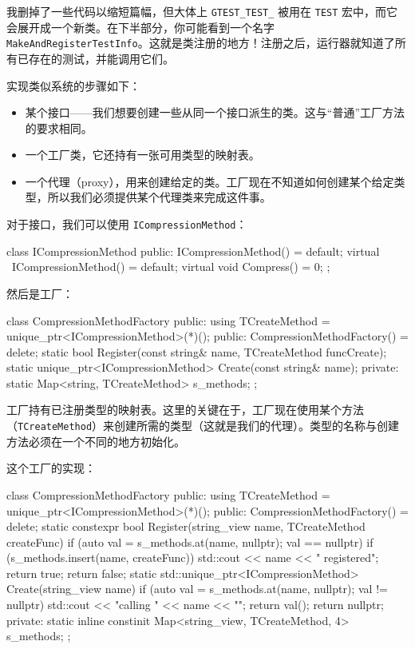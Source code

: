 我删掉了一些代码以缩短篇幅，但大体上 \texttt{GTEST\_TEST\_} 被用在 \texttt{TEST} 宏中，而它会展开成一个新类。在下半部分，你可能看到一个名字 \texttt{MakeAndRegisterTestInfo}。这就是类注册的地方！注册之后，运行器就知道了所有已存在的测试，并能调用它们。

实现类似系统的步骤如下：

\begin{itemize}
\item 某个接口——我们想要创建一些从同一个接口派生的类。这与“普通”工厂方法的要求相同。
\item 一个工厂类，它还持有一张可用类型的映射表。
\item 一个代理（proxy），用来创建给定的类。工厂现在不知道如何创建某个给定类型，所以我们必须提供某个代理类来完成这件事。
\end{itemize}

对于接口，我们可以使用 \texttt{ICompressionMethod}：

\begin{codebox}[cpp]
class ICompressionMethod {
public:
ICompressionMethod() = default;
virtual ~ICompressionMethod() = default;
virtual void Compress() = 0;
};
\end{codebox}

然后是工厂：

\begin{codebox}[cpp]
class CompressionMethodFactory {
public:
using TCreateMethod = unique_ptr<ICompressionMethod>(*)();
public:
CompressionMethodFactory() = delete;
static bool Register(const string& name, TCreateMethod funcCreate);
static unique_ptr<ICompressionMethod> Create(const string& name);
private:
static Map<string, TCreateMethod> s_methods;
};
\end{codebox}

工厂持有已注册类型的映射表。这里的关键在于，工厂现在使用某个方法（\texttt{TCreateMethod}）来创建所需的类型（这就是我们的代理）。类型的名称与创建方法必须在一个不同的地方初始化。

这个工厂的实现：

\begin{codebox}[cpp]
class CompressionMethodFactory {
public:
using TCreateMethod = unique_ptr<ICompressionMethod>(*)();
public:
CompressionMethodFactory() = delete;
static constexpr bool Register(string_view name,
TCreateMethod createFunc) {
if (auto val = s_methods.at(name, nullptr); val == nullptr) {
if (s_methods.insert(name, createFunc)) {
std::cout << name << " registered\n";
return true;
}
}
return false;
}
static std::unique_ptr<ICompressionMethod> Create(string_view name) {
if (auto val = s_methods.at(name, nullptr); val != nullptr) {
std::cout << "calling " << name << "\n";
return val();
}
return nullptr;
}
private:
static inline constinit Map<string_view, TCreateMethod, 4> s_methods;
};
\end{codebox}


